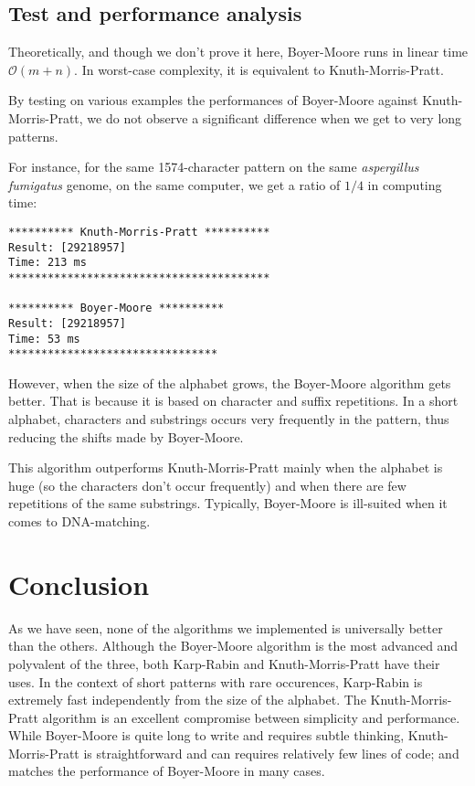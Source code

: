 \documentclass[a4paper,11pt,openany,extrafontsizes,twoside,article]{memoir}
\begin{document}
\section{Test and performance analysis}
\label{sec:test-perf-analys-1}

Theoretically, and though we don't prove it here, Boyer-Moore runs in
linear time $\mathcal{O}(m+n)$. In worst-case complexity, it is equivalent to
Knuth-Morris-Pratt.

By testing on various examples the performances of Boyer-Moore against
Knuth-Morris-Pratt, we do not observe a significant difference when we
get to very long patterns.

For instance, for the same 1574-character pattern on the same
\emph{aspergillus fumigatus} genome, on the same computer, we get a
ratio of $1/4$ in computing time:

\begin{verbatim}
********** Knuth-Morris-Pratt **********
Result: [29218957]
Time: 213 ms
****************************************

********** Boyer-Moore **********
Result: [29218957]
Time: 53 ms
********************************
\end{verbatim}

However, when the size of the alphabet grows, the Boyer-Moore
algorithm gets better. That is because it is based on character and
suffix repetitions. In a short alphabet, characters and substrings
occurs very frequently in the pattern, thus reducing the shifts made
by Boyer-Moore.

This algorithm outperforms Knuth-Morris-Pratt mainly when the alphabet
is huge (so the characters don't occur frequently) and when there are
few repetitions of the same substrings. Typically, Boyer-Moore is
ill-suited when it comes to DNA-matching.


\chapter{Conclusion}
\label{cha:conclusion}

As we have seen, none of the algorithms we implemented is universally
better than the others. Although the Boyer-Moore algorithm is the most
advanced and polyvalent of the three, both Karp-Rabin and
Knuth-Morris-Pratt have their uses. In the context of short patterns
with rare occurences, Karp-Rabin is extremely fast independently from
the size of the alphabet. The Knuth-Morris-Pratt algorithm is an
excellent compromise between simplicity and performance. While
Boyer-Moore is quite long to write and requires subtle thinking,
Knuth-Morris-Pratt is straightforward and can requires relatively few
lines of code; and matches the performance of Boyer-Moore in many
cases.
\end{document}
